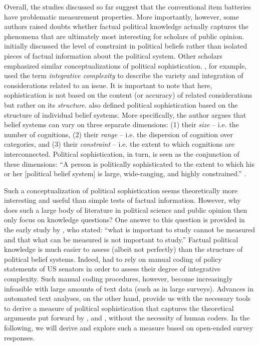 \documentclass[12pt]{article}
\begin{document}
Overall, the studies discussed so far suggest that the conventional item batteries have problematic measurement properties. More importantly, however, some authors raised doubts whether factual political knowledge actually captures the phenomena that are ultimately most interesting for scholars of public opinion. \citet{converse1964nature} initially discussed the level of constraint in political beliefs rather than isolated pieces of factual information about the political system. Other scholars emphasized similar conceptualizations of political sophistication. \citet{tetlock1983cognitive}, for example, used the term \textit{integrative complexity} to describe the variety and integration of considerations related to an issue. It is important to note that here, sophistication is not based on the content (or accuracy) of related considerations but rather on its \textit{structure}. \citet{luskin1987measuring} also defined political sophistication based on the structure of individual belief systems. More specifically, the author argues that belief systems can vary on three separate dimensions: (1) their \textit{size} -- i.e. the number of cognitions, (2) their \textit{range} -- i.e. the dispersion of cognition over categories, and (3) their \textit{constraint} -- i.e. the extent to which cognitions are interconnected. Political sophistication, in turn, is seen as the conjunction of these dimensions: ``A person is politically sophisticated to the extent to which his or her [political belief system] is large, wide-ranging, and highly constrained.'' \citep[860]{luskin1987measuring}.

Such a conceptualization of political sophistication seems theoretically more interesting and useful than simple tests of factual information. However, why does such a large body of literature in political science and public opinion then only focus on knowledge questions? One answer to this question is provided in the early study by \citet[206]{converse1964nature}, who stated: ``what is important to study cannot be measured and that what can be measured is not important to study.'' Factual political knowledge is much easier to assess (albeit not perfectly) than the structure of political belief systems. Indeed, \citet{tetlock1983cognitive} had to rely on manual coding of policy statements of US senators in order to assess their degree of integrative complexity. Such manual coding procedures, however, become increasingly infeasible with large amounts of text data (such as in large surveys). Advances in automated text analyses, on the other hand, provide us with the necessary tools to derive a measure of political sophistication that captures the theoretical arguments put forward by \citet{converse1964nature}, \citet{tetlock1983cognitive} and \citet{luskin1987measuring}, without the necessity of human coders. In the following, we will derive and explore such a measure based on open-ended survey responses.
\end{document}
